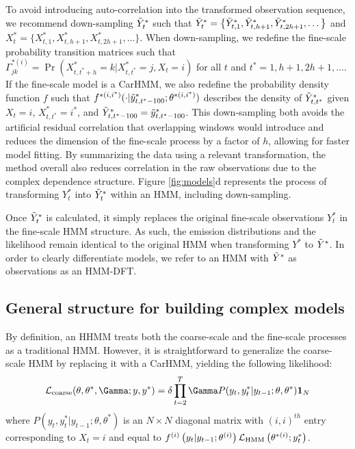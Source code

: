 To avoid introducing auto-correlation into the transformed observation sequence, we recommend down-sampling $\tilde{Y}^*_t$ such that $\tilde{Y}^*_t = \big\{\tilde{Y}^*_{t,1},\tilde{Y}^*_{t,h+1},\tilde{Y}^*_{t,2h+1},\ldots\big\}$ and $X^*_t = \big\{X^*_{t,1},X^*_{t,h+1},X^*_{t,2h+1},\ldots\big\}$. When down-sampling, we redefine the fine-scale probability transition matrices such that $\Gamma^{*(i)}_{jk} = \Pr(X^*_{t,t^*+h} = k | X^*_{t,t^*} = j, X_t = i)$ for all $t$ and $t^* = 1,h+1,2h+1,\ldots$. If the fine-scale model is a CarHMM, we also redefine the probability density function $f$ such that $f^{*(i,i^*)}(\cdot|\tilde{y}^*_{t,t^*-100}; \theta^{*(i,i^*)})$ describes the density of $\tilde{Y}^*_{t,t^*}$ given $X_t = i$, $X^*_{t,t^*} = i^*$, and $\tilde{Y}^*_{t,t^*-100} = \tilde{y}^*_{t,t^*-100}$.
This down-sampling both avoids the artificial residual correlation that overlapping windows would introduce and reduces the dimension of the fine-scale process by a factor of $h$, allowing for faster model fitting. By summarizing the data using a relevant transformation, the method overall also reduces correlation in the raw observations due to the complex dependence structure. Figure \ref{fig:models}d represents the process of transforming $Y^*_{t}$ into $\tilde{Y}^*_{t}$ within an HMM, including down-sampling.

Once $\tilde{Y}^*_t$ is calculated, it simply replaces the original fine-scale observations $Y^*_t$ in the fine-scale HMM structure. As such, the emission distributions and the likelihood remain identical to the original HMM when transforming $Y^*$ to $\tilde{Y}^*$. In order to clearly differentiate models, we refer to an HMM with $\tilde{Y}^*$ as observations as an HMM-DFT.

\subsection{General structure for building complex models}

By definition, an HHMM treats both the coarse-scale and the fine-scale processes as a traditional HMM. However, it is straightforward to generalize the coarse-scale HMM by replacing it with a CarHMM, yielding the following likelihood:
\[
\calL_{\text{coarse}}(\theta,\theta^*,\Gamma;y,y^*) = \delta \prod_{t=2}^T \Gamma P(y_t,y^*_t|y_{t-1};\theta,\theta^*) \mathbf{1}_N
\]
where $P(y_t,y^*_t|y_{t-1};\theta,\theta^*) $ is an $N \times N$ diagonal matrix with $(i,i)^{th}$ entry corresponding to $X_t=i$ and equal to $f^{(i)}\left(y_t|y_{t-1};\theta^{(i)}\right)\mathcal{L}_{\text{HMM}}\left(\theta^{*(i)};y^*_t\right)$. 

